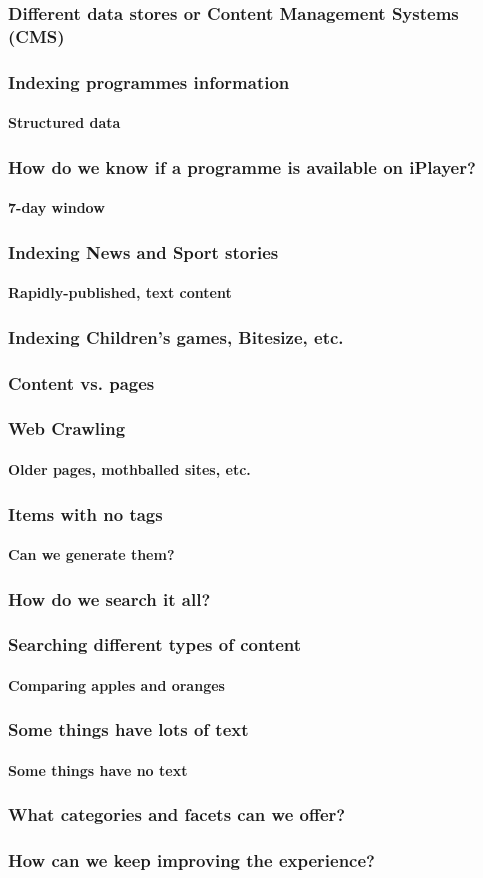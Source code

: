 \documentclass{beamer}
\begin{document}
\begin{frame}
  \frametitle{Different data stores or Content Management Systems (CMS)}
\end{frame}

\begin{frame}
  \frametitle{Indexing programmes information}
  \framesubtitle{Structured data}
\end{frame}

\begin{frame}
  \frametitle{How do we know if a programme is available on iPlayer?}
  \framesubtitle{7-day window}
\end{frame}

\begin{frame}
  \frametitle{Indexing News and Sport stories}
  \framesubtitle{Rapidly-published, text content}
\end{frame}

\begin{frame}
  \frametitle{Indexing Children's games, Bitesize, etc.}
  \frametitle{Content vs. pages}
\end{frame}

\begin{frame}
  \frametitle{Web Crawling}
  \framesubtitle{Older pages, mothballed sites, etc.}
\end{frame}

\begin{frame}
  \frametitle{Items with no tags}
  \framesubtitle{Can we generate them?}
\end{frame}

\begin{frame}
  \frametitle{How do we search it all?}
\end{frame}

\begin{frame}
  \frametitle{Searching different types of content}
  \framesubtitle{Comparing apples and oranges}
\end{frame}

\begin{frame}
  \frametitle{Some things have lots of text}
  \framesubtitle{Some things have no text}
\end{frame}

\begin{frame}
  \frametitle{What categories and facets can we offer?}
\end{frame}

\begin{frame}
  \frametitle{How can we keep improving the experience?}
\end{frame}
\end{document}
